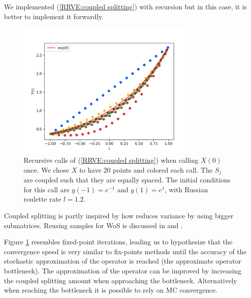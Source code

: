 \documentclass[a4paper,12pt]{article}
\begin{document}
\begin{pythonn} \label{py:coupled splitting}
    We implemented (\ref{RRVE:coupled splitting}) with recursion but in this case, it
    is better to implement it forwardly. \\

    \begin{figure}[h!]
        \centering
        \includegraphics[width=0.8\textwidth]{plots/coupled split.png}
        \caption{Recursive calls of (\ref{RRVE:coupled splitting}) when
        calling $X(0)$ once. We chose $X$ to have $20$ points and
        colored each call. The $S_{j}$ are coupled such that
        they are equally spaced.
        The initial conditions for this call are $y(-1)=e^{-1}$ and $y(1)=e^{1}$,
        with Russian roulette rate $l=1.2$. }
        \label{fig:coupled splitting}
    \end{figure}
\end{pythonn}

\begin{related}
    Coupled splitting is partly inspired by how \cite{sabelfeld_sparsified_2009}
    reduces variance by using bigger submatrices.
    Reusing samples for WoS is discussed
    in \cite{miller_boundary_2023} and \cite{bakbouk_mean_2023}.
\end{related}

Figure \ref{fig:coupled splitting}
resembles fixed-point iterations, leading us to hypothesize
that the convergence
speed is very similar to fix-points methods until the accuracy
of the stochastic approximation of the operator is reached
(the approximate operator bottleneck). The approximation of the operator
can be improved by increasing the coupled splitting amount when
approaching the bottleneck. Alternatively when reaching
the bottleneck it is possible to rely on MC convergence.
\end{document}

